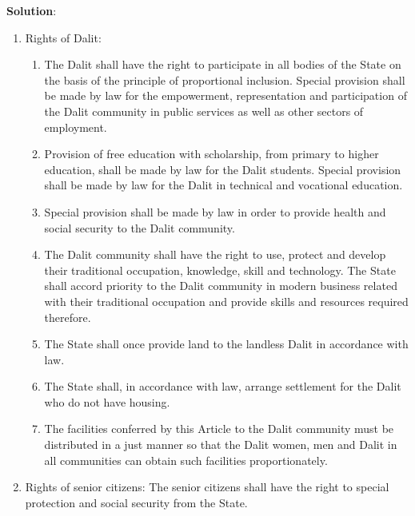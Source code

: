 \documentclass[
]{book}
\newenvironment{solution}{ {\bfseries Solution}:}{}
\begin{document}
\begin{questions}
\begin{solution}
\begin{enumerate}
\item Rights of Dalit:
\begin{enumerate}
\item The Dalit shall have the right to participate in all bodies of the State on the basis of the principle of proportional inclusion. Special provision shall be made by law for the empowerment, representation and participation of the Dalit community in public services as well as other sectors of employment.
\item Provision of free education with scholarship, from primary to higher education, shall be made by law for the Dalit students. Special provision shall be made by law for the Dalit in technical and vocational education.
\item Special provision shall be made by law in order to provide health and social security to the Dalit community.
\item The Dalit community shall have the right to use, protect and develop their traditional occupation, knowledge, skill and technology. The State shall accord priority to the Dalit community in modern business related with their traditional occupation and provide skills and resources required therefore.
\item The State shall once provide land to the landless Dalit in accordance with law.
\item The State shall, in accordance with law, arrange settlement for the Dalit who do not have housing.
\item The facilities conferred by this Article to the Dalit community must be distributed in a just manner so that the Dalit women, men and Dalit in all communities can obtain such facilities proportionately.
\end{enumerate}

\item Rights of senior citizens: The senior citizens shall have the right to special protection and social security from the State.


\end{enumerate}
\end{solution}
\end{questions}
\end{document}
